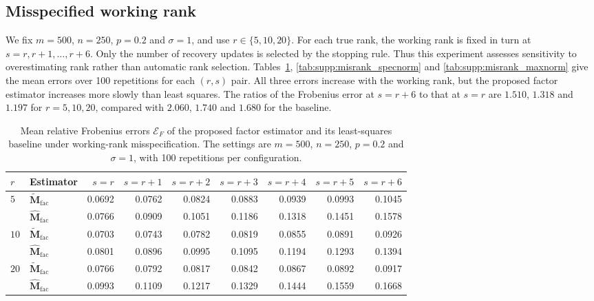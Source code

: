 \documentclass[numsec,webpdf,modern,large,namedate]{oup-authoring-template}
\theoremstyle{plain}
\theoremstyle{remark}
\newcommand{\M}{\bm{M}}
\newif\ifmarkchanges
\newenvironment{revision}{\begingroup\ifmarkchanges\color{red}\fi}{\endgroup}
\begin{document}
\begin{revision}
\subsection{Misspecified working rank}
We fix $m=500$, $n=250$, $p=0.2$ and $\sigma=1$, and use $r\in\{5,10,20\}$. For each true rank, the working rank is fixed in turn at $s=r,r+1,\ldots,r+6$. Only the number of recovery updates is selected by the stopping rule. Thus this experiment assesses sensitivity to overestimating rank rather than automatic rank selection.
Tables~\ref{tab:supp:misrank_fnorm}, \ref{tab:supp:misrank_specnorm} and \ref{tab:supp:misrank_maxnorm} give the mean errors over 100 repetitions for each $(r,s)$ pair. All three errors increase with the working rank, but the proposed factor estimator increases more slowly than least squares. The ratios of the Frobenius error at $s=r+6$ to that at $s=r$ are $1.510$, $1.318$ and $1.197$ for $r=5,10,20$, compared with $2.060$, $1.740$ and $1.680$ for the baseline.

\end{revision}
\begin{table}[!htbp]
\centering
\caption{Mean relative Frobenius errors $\mathcal E_F$ of the proposed factor estimator and its least-squares baseline under working-rank misspecification. The settings are $m=500$, $n=250$, $p=0.2$ and $\sigma=1$, with 100 repetitions per configuration.}
\label{tab:supp:misrank_fnorm}
\begingroup
\small
{}
\setlength{\tabcolsep}{3.2pt}
\begin{tabular}{@{}llrrrrrrr@{}}
\toprule
$r$ & Estimator & $s=r$ & $s=r+1$ & $s=r+2$ & $s=r+3$ & $s=r+4$ & $s=r+5$ & $s=r+6$ \\
\midrule
\multirow{2}{*}{$5$} & $\widetilde{\M}_{\mathrm{fac}}$ & 0.0692 & 0.0762 & 0.0824 & 0.0883 & 0.0939 & 0.0993 & 0.1045 \\
 & $\widehat{\M}_{\mathrm{fac}}$ & 0.0766 & 0.0909 & 0.1051 & 0.1186 & 0.1318 & 0.1451 & 0.1578 \\
\midrule
\multirow{2}{*}{$10$} & $\widetilde{\M}_{\mathrm{fac}}$ & 0.0703 & 0.0743 & 0.0782 & 0.0819 & 0.0855 & 0.0891 & 0.0926 \\
 & $\widehat{\M}_{\mathrm{fac}}$ & 0.0801 & 0.0896 & 0.0995 & 0.1095 & 0.1194 & 0.1293 & 0.1394 \\
\midrule
\multirow{2}{*}{$20$} & $\widetilde{\M}_{\mathrm{fac}}$ & 0.0766 & 0.0792 & 0.0817 & 0.0842 & 0.0867 & 0.0892 & 0.0917 \\
 & $\widehat{\M}_{\mathrm{fac}}$ & 0.0993 & 0.1109 & 0.1217 & 0.1329 & 0.1444 & 0.1559 & 0.1668 \\
\bottomrule
\end{tabular}
\endgroup
\end{table}
\end{document}
